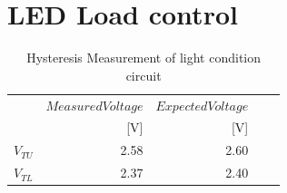  \section{LED Load control}
 
 \begin{table}[!htb]
 	\centering
 	\footnotesize
 	\caption{Hysteresis Measurement of light condition circuit}
 	\begin{tabular}{lrrrr}
 		\toprule
 		& $Measured Voltage$&$Expected Voltage$ \\
 		&  [V]&[V] \\
 		\midrule
 		$V_{TU}$      &2.58&2.60  \\
 		$V_{TL}$     & 2.37&2.40\\
 		
 		\bottomrule
 	\end{tabular}
 	\label{tab:hyst meas_light}
 \end{table}




